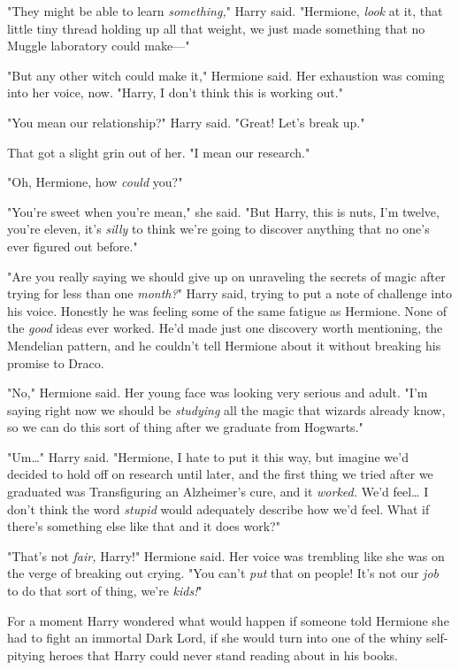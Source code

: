 "They might be able to learn \emph{something,}" Harry said. "Hermione,
\emph{look} at it, that little tiny thread holding up all that weight, we just
made something that no Muggle laboratory could make---"

"But any other witch could make it," Hermione said. Her exhaustion was coming
into her voice, now. "Harry, I don't think this is working out."

"You mean our relationship?" Harry said. "Great! Let's break up."

That got a slight grin out of her. "I mean our research."

"Oh, Hermione, how \emph{could} you?"

"You're sweet when you're mean," she said. "But Harry, this is nuts, I'm
twelve, you're eleven, it's \emph{silly} to think we're going to discover
anything that no one's ever figured out before."

"Are you really saying we should give up on unraveling the secrets of magic
after trying for less than one \emph{month?}" Harry said, trying to put a note
of challenge into his voice. Honestly he was feeling some of the same fatigue
as Hermione. None of the \emph{good} ideas ever worked. He'd made just one
discovery worth mentioning, the Mendelian pattern, and he couldn't tell
Hermione about it without breaking his promise to Draco.

"No," Hermione said. Her young face was looking very serious and adult. "I'm
saying right now we should be \emph{studying} all the magic that wizards
already know, so we can do this sort of thing after we graduate from Hogwarts."

"Um{\ldots}" Harry said. "Hermione, I hate to put it this way, but imagine we'd
decided to hold off on research until later, and the first thing we tried after
we graduated was Transfiguring an Alzheimer's cure, and it \emph{worked.} We'd
feel{\ldots} I don't think the word \emph{stupid} would adequately describe how
we'd feel. What if there's something else like that and it does work?"

"That's not \emph{fair,} Harry!" Hermione said. Her voice was trembling like
she was on the verge of breaking out crying. "You can't \emph{put} that on
people! It's not our \emph{job} to do that sort of thing, we're \emph{kids!}"

For a moment Harry wondered what would happen if someone told Hermione she had
to fight an immortal Dark Lord, if she would turn into one of the whiny
self-pitying heroes that Harry could never stand reading about in his books.


